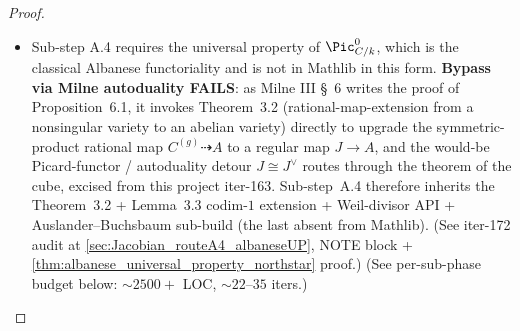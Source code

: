 \begin{proof}
\begin{itemize}
    \item Sub-step A.4 requires the universal property of \(\Pic^0_{C/k}\), which is the classical Albanese functoriality and is not in Mathlib in this form. \textbf{Bypass via Milne autoduality FAILS}: as Milne III \S~6 writes the proof of Proposition~6.1, it invokes Theorem~3.2 (rational-map-extension from a nonsingular variety to an abelian variety) directly to upgrade the symmetric-product rational map \(C^{(g)} \dashrightarrow A\) to a regular map \(J \to A\), and the would-be Picard-functor / autoduality detour \(J \cong J^\vee\) routes through the theorem of the cube, excised from this project iter-163. Sub-step~A.4 therefore inherits the Theorem~3.2 + Lemma~3.3 codim-\(1\) extension + Weil-divisor API + Auslander--Buchsbaum sub-build (the last absent from Mathlib). (See iter-172 audit at \cref{sec:Jacobian_routeA4_albaneseUP}, NOTE block + \cref{thm:albanese_universal_property_northstar} proof.) (See per-sub-phase budget below: \(\sim 2500{+}\) LOC, \(\sim 22\)--\(35\) iters.)
  \end{itemize}

\end{proof}
